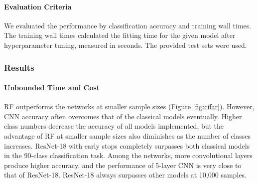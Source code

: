 \paragraph{Evaluation Criteria}
We evaluated the performance by classification accuracy and training wall times. The training wall times calculated the fitting time for the given model after hyperparameter tuning, measured in seconds. The provided test sets were used.

\subsubsection{Results}
\paragraph{Unbounded Time and Cost}
RF outperforms the networks at smaller sample sizes (Figure \ref{fig:cifar}). However, CNN accuracy often overcomes that of the classical models eventually. Higher class numbers decrease the accuracy of all models implemented, but the advantage of RF at smaller sample sizes also diminishes as the number of classes increases. ResNet-18 with early stops completely surpasses both classical models in the 90-class classification task. Among the networks, more convolutional layers produce higher accuracy, and the performance of 5-layer CNN is very close to that of ResNet-18. ResNet-18 always surpasses other models at 10,000 samples.

